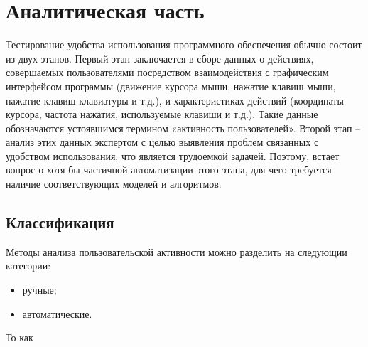 \chapter{Аналитическая часть}
Тестирование удобства использования программного обеспечения обычно состоит из двух этапов.
Первый этап заключается в сборе данных о действиях, совершаемых пользователями посредством взаимодействия с графическим интерфейсом программы (движение курсора мыши, нажатие клавиш мыши, нажатие клавиш клавиатуры и т.д.), и характеристиках действий (координаты курсора, частота нажатия, используемые клавиши и т.д.).
Такие данные обозначаются устоявшимся термином «активность пользователей».
Второй этап – анализ этих данных экспертом с целью выявления проблем связанных с удобством использования, что является трудоемкой задачей.
Поэтому, встает вопрос о хотя бы частичной автоматизации этого этапа, для чего требуется наличие соответствующих моделей и алгоритмов.


\section{Классификация}
Методы анализа пользовательской активности можно разделить на следующии категории:
\begin{itemize}
	\item ручные;
	\item автоматические.
\end{itemize}
То как